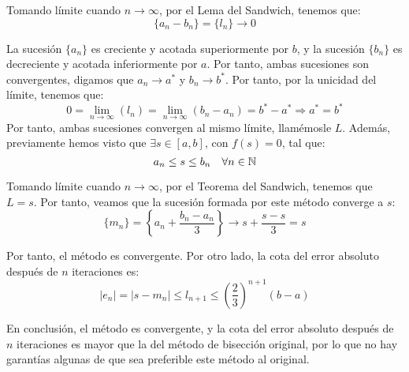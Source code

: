 \begin{ejercicio}
    Tomando límite cuando $n\to\infty$, por el Lema del Sandwich, tenemos que:
    \begin{equation*}
        \{a_n-b_n\}=\{l_n\}\to 0
    \end{equation*}

    La sucesión $\{a_n\}$ es creciente y acotada superiormente por $b$, y la sucesión $\{b_n\}$ es decreciente y acotada inferiormente por $a$. Por tanto, ambas sucesiones son convergentes, digamos que $a_n\to a^*$ y $b_n\to b^*$. Por tanto, por la unicidad del límite, tenemos que:
    \begin{equation*}
        0 = \lim_{n\to\infty}(l_n) = \lim_{n\to\infty}(b_n-a_n)=b^*-a^*
        \Longrightarrow a^*=b^*
    \end{equation*}
    Por tanto, ambas sucesiones convergen al mismo límite, llamémosle $L$. Además, previamente hemos visto que $\exists s\in [a,b]$, con $f(s)=0$, tal que:
    \begin{equation*}
        a_n\leq s\leq b_n\quad \forall n\in \mathbb{N}
    \end{equation*}

    Tomando límite cuando $n\to\infty$, por el Teorema del Sandwich, tenemos que $L=s$. Por tanto, veamos que la sucesión formada por este método converge a $s$:
    \begin{equation*}
        \{m_n\}=\left\{a_n+\dfrac{b_n-a_n}{3}\right\}\to s+\dfrac{s-s}{3}=s
    \end{equation*}

    Por tanto, el método es convergente. Por otro lado, la cota del error absoluto después de $n$ iteraciones es:
    \begin{equation*}
        |e_n|=|s-m_n|\leq l_{n+1}\leq \left(\dfrac{2}{3}\right)^{n+1}(b-a)
    \end{equation*}

    En conclusión, el método es convergente, y la cota del error absoluto después de $n$ iteraciones es mayor que la del método de bisección original, por lo que no hay garantías algunas de que sea preferible este método al original.
\end{ejercicio}

